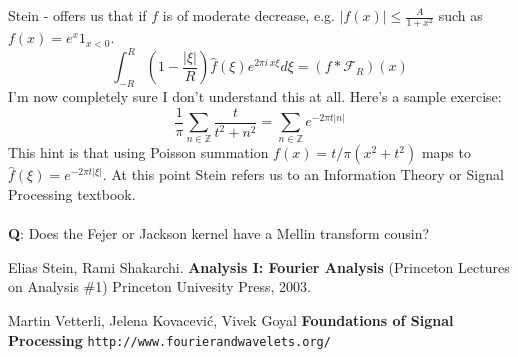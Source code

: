 \documentclass[12pt]{article}
\begin{document}
Stein - offers us that if $f$ is of moderate decrease, e.g. $|f(x)| \leq \frac{A}{1 + x^2} $ such as $f(x) = e^x 1_{x < 0} $.
$$ \int_{-R}^R \left( 1 - \frac{|\xi|}{R} \right)\hat{f}(\xi) e^{2\pi i \, x \xi} d\xi = (f * \mathcal{F}_R)(x) $$
I'm now completely sure I don't understand this at all.  Here's a sample exercise:
$$ \frac{1}{\pi} \sum_{n \in \mathbb{Z}} \frac{t}{t^2 + n^2} = \sum_{n \in \mathbb{Z}} e^{-2\pi t |n|}$$
This hint is that using Poisson summation $f(x) = t/\pi(x^2 + t^2)$ maps to $\hat{f}(\xi) = e^{- 2\pi t |\xi|}$.  At this point Stein refers us to an Information Theory or Signal Processing textbook. \\ \\
\textbf{Q}: Does the Fejer or Jackson kernel have a Mellin transform cousin?
\vfill
\begin{thebibliography}{}

\item Elias Stein, Rami Shakarchi. \textbf{Analysis I: Fourier Analysis} (Princeton Lectures on Analysis \#1) Princeton Univesity Press, 2003.

\item Martin Vetterli, Jelena Kovacevi\'{c}, Vivek Goyal \textbf{Foundations of Signal Processing} \texttt{http://www.fourierandwavelets.org/} 

\end{thebibliography}
\end{document}
